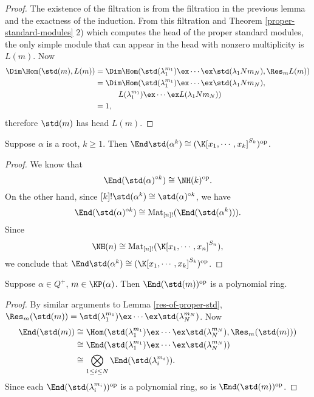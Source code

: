 \begin{proof}
    The existence of the filtration is from the filtration
    in the previous lemma and the exactness of the induction.
    From this filtration and Theorem \ref{proper-standard-modules} 2)
    which computes the head of the proper standard modules,
    the only simple module that can appear in the head with nonzero
    multiplicity is $L(m)$. Now 
    \[
    \begin{aligned}
        \Dim\Hom(\std(m),L(m))
        & = \Dim\Hom(\std(\lambda_1^{m_1})\ex\cdots
        \ex\std(\lambda_1N{m_N}),\Res_mL(m))\\
        & = \Dim\Hom(\std(\lambda_1^{m_1})\ex\cdots
        \ex\std(\lambda_1N{m_N}),\\&\hspace{3em}L(\lambda_1^{m_1})\ex\cdots
        \ex L(\lambda_1N{m_N}))\\& = 1,
    \end{aligned}
    \] 
    therefore $\std(m)$ has head $L(m)$.
\end{proof}

\begin{lemma}\label{end-of-divided-power}
    Suppose $\alpha$ is a root, $k\ge 1$. Then 
    $\End\std(\alpha^k)\cong(\K[x_1,\cdots,x_k]^{S_k})^{\mathrm{op}}$.
\end{lemma}

\begin{proof}
    We know that 
    \[
        \End(\std(\alpha)^{\circ k})
        \cong\NH(k)^{\mathrm{op}}.
    \] 
    On the other hand, since 
    $[k]!\std(\alpha^k)\cong\std(\alpha)^{\circ k}$,
    we have $$\End(\std(\alpha)^{\circ k})\cong\operatorname{Mat}
    _{[n]!}(\End(\std(\alpha^k))).$$ Since 
    \[
        \NH(n)\cong\operatorname{Mat}_{[n]!}(\K[x_1,\cdots,x_n]^{S_n}),
    \]
    we conclude that $\End\std(\alpha^k)\cong
    (\K[x_1,\cdots,x_k]^{S_k})^{\mathrm{op}}$.
\end{proof}

\begin{proposition}\label{end-is-polynomial-ring}
    Suppose $\alpha\in Q^+$, $m\in\KP(\alpha)$. Then $\End(\std(m))^{\mathrm{op}}$
    is a polynomial ring.
\end{proposition}

\begin{proof}
    By similar arguments to Lemma \ref{res-of-proper-std},
    $\Res_m(\std(m)) = \std(\lambda_1^{m_1})\ex\cdots\ex\std(\lambda_N^{m_N})$.
    Now 
    \[
    \begin{aligned}
        \End(\std(m))&\cong\Hom(\std(\lambda_1^{m_1})\ex\cdots\ex\std(\lambda_N^{m_N}),
        \Res_m(\std(m)))\\
        &\cong\End(\std(\lambda_1^{m_1})\ex\cdots\ex\std(\lambda_N^{m_N}))\\
        &\cong\bigotimes_{1\le i\le N}\End(\std(\lambda_i^{m_i})).
    \end{aligned}
    \]
    Since each $\End(\std(\lambda_i^{m_i}))^{\mathrm{op}}$ is a polynomial ring,
    so is $\End(\std(m))^{\mathrm{op}}$.
\end{proof}

